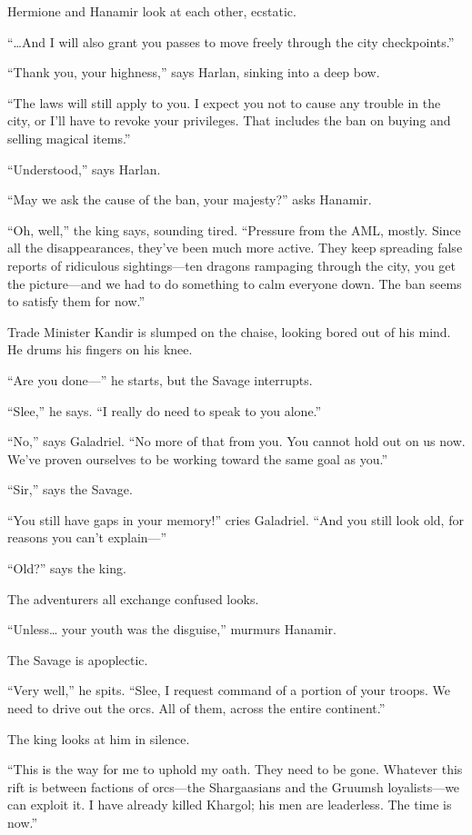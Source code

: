 \documentclass[smalldemyvopaper,11pt,twoside,onecolumn,openright,extrafontsizes]{memoir}
\begin{document}
Hermione and Hanamir look at each other, ecstatic.

``\ldots And I will also grant you passes to move freely through the
city checkpoints.''

``Thank you, your highness,'' says Harlan, sinking into a deep bow.

``The laws will still apply to you. I expect you not to cause any
trouble in the city, or I'll have to revoke your privileges. That
includes the ban on buying and selling magical items.''

``Understood,'' says Harlan.

``May we ask the cause of the ban, your majesty?'' asks Hanamir.

``Oh, well,'' the king says, sounding tired. ``Pressure from the AML,
mostly. Since all the disappearances, they've been much more active.
They keep spreading false reports of ridiculous sightings---ten dragons
rampaging through the city, you get the picture---and we had to do
something to calm everyone down. The ban seems to satisfy them for
now.''

Trade Minister Kandir is slumped on the chaise, looking bored out of his
mind. He drums his fingers on his knee.

``Are you done---'' he starts, but the Savage interrupts.

``Slee,'' he says. ``I really do need to speak to you alone.''

``No,'' says Galadriel. ``No more of that from you. You cannot hold out
on us now. We've proven ourselves to be working toward the same goal as
you.''

``Sir,'' says the Savage.

``You still have gaps in your memory!'' cries Galadriel. ``And you still
look old, for reasons you can't explain---''

``Old?'' says the king.

The adventurers all exchange confused looks.

``Unless\ldots{} your youth was the disguise,'' murmurs Hanamir.

The Savage is apoplectic.

``Very well,'' he spits. ``Slee, I request command of a portion of your
troops. We need to drive out the orcs. All of them, across the entire
continent.''

The king looks at him in silence.

``This is the way for me to uphold my oath. They need to be gone.
Whatever this rift is between factions of orcs---the Shargaasians and
the Gruumsh loyalists---we can exploit it. I have already killed
Khargol; his men are leaderless. The time is now.''
\end{document}
